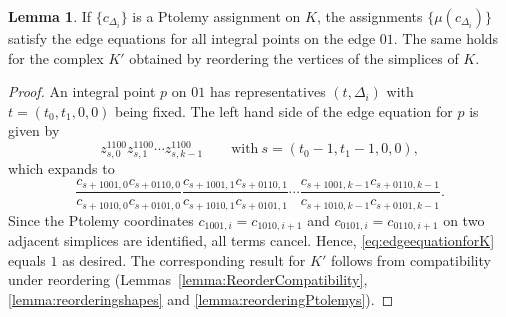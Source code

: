 \documentclass[12pt]{amsart}
\theoremstyle{definition}
\newtheorem{lemma}[theorem]{Lemma}
\numberwithin{equation}{section}
\begin{document}
\begin{lemma}\label{lemma:edgelocalmodel}
If $\{c_{\Delta_i}\}$ is a Ptolemy assignment on $K$, the assignments $\{\mu(c_{\Delta_i})\}$ satisfy the edge equations for all integral points on the edge $01$. The same holds for the complex $K'$ obtained by reordering the vertices of the simplices of $K$.
\end{lemma}
\begin{proof}
An integral point $p$ on $01$ has representatives $(t,\Delta_i)$ with $t=(t_0,t_1,0,0)$ being fixed. The left hand side of the edge equation for $p$ is given by
\begin{equation}\label{eq:edgeequationforK}
z^{1100}_{s,0}z^{1100}_{s,1}\cdots z^{1100}_{s,k-1}\qquad\mbox{with}~s=(t_0-1,t_1-1,0,0),
\end{equation}
which expands to
$$\frac{c_{s+1001,0}c_{s+0110,0}}{c_{s+1010,0}c_{s+0101,0}}\frac{c_{s+1001,1}c_{s+0110,1}}{c_{s+1010,1}c_{s+0101,1}}\cdots \frac{c_{s+1001,k-1}c_{s+0110,k-1}}{c_{s+1010,k-1}c_{s+0101,k-1}}.$$
Since the Ptolemy coordinates $c_{1001,i}=c_{1010,i+1}$ and $c_{0101,i}=c_{0110,i+1}$ on two adjacent simplices are identified, all terms cancel. Hence, \eqref{eq:edgeequationforK} equals $1$ as desired. The corresponding result for $K'$ follows from compatibility under reordering (Lemmas~\ref{lemma:ReorderCompatibility}, \ref{lemma:reorderingshapes} and \ref{lemma:reorderingPtolemys}).
\end{proof}
\end{document}
